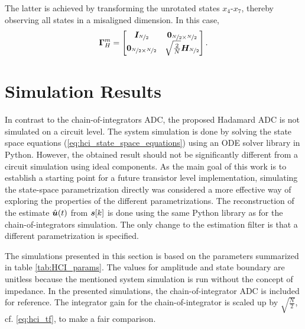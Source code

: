 The latter is achieved by transforming the unrotated states $x_4$-$x_7$, thereby observing all states in a misaligned dimension. In this case,
\begin{equation}
    \bm{\Gamma}_{H}^m =
    \begin{bmatrix}
        \bm{I}_{\nicefrac{N}{2}}    & \bm{0}_{\nicefrac{N}{2} \times \nicefrac{N}{2}} \\
        \bm{0}_{\nicefrac{N}{2} \times \nicefrac{N}{2}}    & \sqrt{\frac{2}{N}}\bm{H_}{\nicefrac{N}{2}}
    \end{bmatrix}.
\end{equation}















\section{Simulation Results}
In contrast to the chain-of-integrators ADC, the proposed Hadamard ADC is not simulated on a circuit level. The system simulation is done by solving the state space equations (\ref{eq:hci_state_space_equations}) using an ODE solver library in Python. However, the obtained result should not be significantly different from a circuit simulation using ideal components. As the main goal of this work is to establish a starting point for a future transistor level implementation, simulating the state-space parametrization directly was considered a more effective way of exploring the properties of the different parametrizations. The reconstruction of the estimate $\hat{\bm{u}}(t)$ from $\bm{s}[k]$ is done using the same Python library as for the chain-of-integrators simulation. The only change to the estimation filter is that a different parametrization is specified.

The simulations presented in this section is based on the parameters summarized in table \ref{tab:HCI_params}. The values for amplitude and state boundary are unitless because the mentioned system simulation is run without the concept of impedance. In the presented simulations, the chain-of-integrator ADC is included for reference. The integrator gain for the chain-of-integrator is scaled up by $\sqrt{\frac{N}{2}}$, cf. \ref{eq:hci_tf}, to make a fair comparison.



